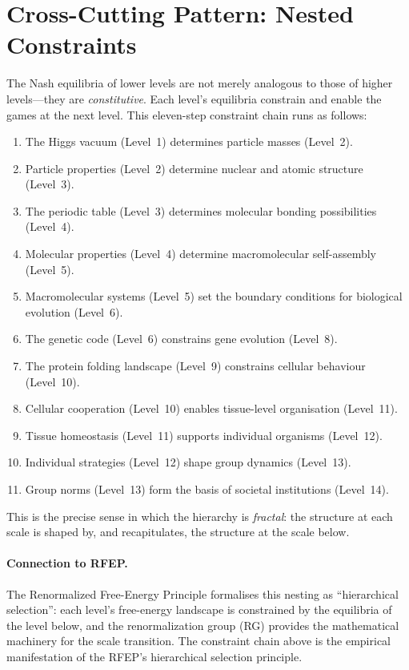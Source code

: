 \documentclass[12pt,a4paper]{article}
\theoremstyle{remark}
\begin{document}
\section{Cross-Cutting Pattern: Nested Constraints}
\label{sec:nested_constraints}

The Nash equilibria of lower levels are not merely analogous to those of higher levels---they are \emph{constitutive}. Each level's equilibria constrain and enable the games at the next level. This eleven-step constraint chain runs as follows:

\begin{enumerate}[label=(\arabic*)]
  \item The Higgs vacuum (Level~1) determines particle masses (Level~2).
  \item Particle properties (Level~2) determine nuclear and atomic structure (Level~3).
  \item The periodic table (Level~3) determines molecular bonding possibilities (Level~4).
  \item Molecular properties (Level~4) determine macromolecular self-assembly (Level~5).
  \item Macromolecular systems (Level~5) set the boundary conditions for biological evolution (Level~6).
  \item The genetic code (Level~6) constrains gene evolution (Level~8).
  \item The protein folding landscape (Level~9) constrains cellular behaviour (Level~10).
  \item Cellular cooperation (Level~10) enables tissue-level organisation (Level~11).
  \item Tissue homeostasis (Level~11) supports individual organisms (Level~12).
  \item Individual strategies (Level~12) shape group dynamics (Level~13).
  \item Group norms (Level~13) form the basis of societal institutions (Level~14).
\end{enumerate}

This is the precise sense in which the hierarchy is \emph{fractal}: the structure at each scale is shaped by, and recapitulates, the structure at the scale below.

\paragraph{Connection to RFEP.}
The Renormalized Free-Energy Principle \citep{GeigerRFEP2026} formalises this nesting as ``hierarchical selection'': each level's free-energy landscape is constrained by the equilibria of the level below, and the renormalization group (RG) provides the mathematical machinery for the scale transition. The constraint chain above is the empirical manifestation of the RFEP's hierarchical selection principle.
\end{document}

